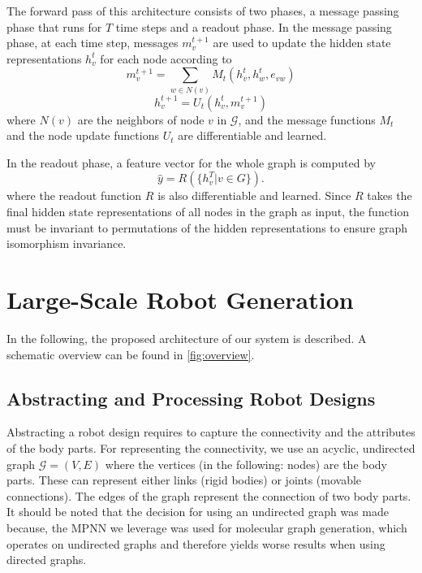 \documentclass{article}
\theoremstyle{plain}
\theoremstyle{definition}
\theoremstyle{remark}
\begin{document}
The forward pass of this architecture consists of two phases, a message passing phase that runs for $T$ time steps and a readout phase. In the message passing phase, at each time step, messages $m_v^{t+1}$ are used to update the hidden state representations $h_v^{t}$ for each node according to
\begin{equation}
m_v^{t+1} = \sum_{w \in N(v)} M_t(h_v^t, h_w^t, e_{vw})
\end{equation}
\begin{equation}
h_v^{t+1} = U_t(h_v^t, m_v^{t+1})
\end{equation}
where $N(v)$ are the neighbors of node $v$ in $\mathcal{G}$, and the message functions $M_t$ and the node update functions $U_t$ are differentiable and learned.

In the readout phase, a feature vector for the whole graph is computed by 
\begin{equation}
\hat{y} = R(\{h_v^T | v \in G\}).
\end{equation}
where the readout function $R$ is also differentiable and learned. Since $R$ takes the final hidden state representations of all nodes in the graph as input, the function must be invariant to permutations of the hidden representations to ensure graph isomorphism invariance.

\section{Large-Scale Robot Generation}
In the following, the proposed architecture of our system is described. A schematic overview can be found in \cref{fig:overview}.

\subsection{Abstracting and Processing Robot Designs} \label{data_collection_and_processing}
Abstracting a robot design requires to capture the connectivity and the attributes of the body parts. For representing the connectivity, we use an acyclic, undirected graph $\mathcal{G} = (V, E)$ where the vertices (in the following: nodes) are the body parts. These can represent either links (rigid bodies) or joints (movable connections). The edges of the graph represent the connection of two body parts. It should be noted that the decision for using an undirected graph was made because, the MPNN we leverage was used for molecular graph generation, which operates on undirected graphs and therefore yields worse results when using directed graphs.
\end{document}
